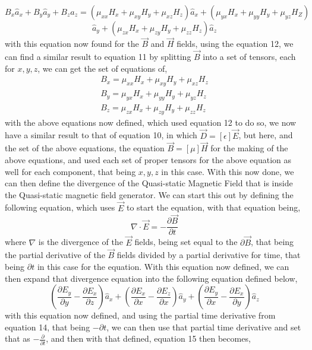 \documentclass[]{article}
\begin{document}
\[B_x\hat{a}_x + B_y\hat{a}_y+B_z\hat{a}_z = (\mu_{xx}H_x+\mu_{xy}H_y + \mu_{xz}H_z)\hat{a}_x + (\mu_{yx}H_x + \mu_{yy}H_y + \mu_{yz}H_Z)\]
\[\hat{a}_y + (\mu_{zx}H_x + \mu_{zy}H_y+ \mu_{zz}H_z)\hat{a}_z\]
with this equation now found for the $\vec{B}$ and $\vec{H}$ fields, using the equation 12, we can find a similar result to equation 11 by splitting $\vec{B}$ into a set of tensors, each for $x,y,z$, we can get the set of equations of,
\begin{equation}
\begin{array}{c}
B_x = \mu_{xx}H_x + \mu_{xy}H_y + \mu_{xz}H_z \\
B_y = \mu_{yx}H_x + \mu_{yy}H_y + \mu_{yz}H_z \\
B_z = \mu_{zx}H_x + \mu_{zy}H_y + \mu_{zz}H_z
\end{array}
\end{equation}
with the above equations now defined, which used equation 12 to do so, we now have a similar result to that of equation 10, in which $\vec{D} = [\epsilon]\vec{E}$, but here, and the set of the above equations, the equation $\vec{B} = [\mu]\vec{H}$ for the making of the above equations, and used each set of proper tensors for the above equation as well for each component, that being $x,y,z$ in this case. With this now done, we can then define the divergence of the Quasi-static Magnetic Field that is inside the Quasi-static magnetic field generator. We can start this out by defining the following equation, which uses $\vec{E}$ to start the equation, with that equation being,
\begin{equation}
\nabla \cdot \vec{E} = -\frac{\partial{\vec{B}}}{\partial{t}}
\end{equation}
where $\nabla$ is the divergence of the $\vec{E}$ fields, being set equal to the $\partial{\vec{B}}$, that being the partial derivative of the $\vec{B}$ fields divided by a partial derivative for time, that being $\partial{t}$ in this case for the equation. With this equation now defined, we can then expand that divergence equation into the following equation defined below,
\begin{equation}
(\frac{\partial{E}_y}{\partial{y}} - \frac{\partial{E}_x}{\partial{z}})\hat{a}_x + (\frac{\partial{E}_x}{\partial{x}} - \frac{\partial{E}_z}{\partial{x}}) \hat{a}_y + (\frac{\partial{E}_y}{\partial{x}} - \frac{\partial{E}_x}{\partial{y}})\hat{a}_z
\end{equation}
with this equation now defined, and using the partial time derivative from equation 14, that being $-\partial{t}$, we can then use that partial time derivative and set that as $-\frac{\partial}{\partial{t}}$, and then with that defined, equation 15 then becomes,
\end{document}

